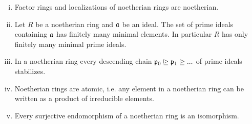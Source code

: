 	\begin{lemma}\vspace{-1.5em}
		\begin{enumerate}[(i)]
			\item{
				Factor rings and localizations of noetherian rings are noetherian.
			}
			\item{
				Let $R$ be a noetherian ring and $\mathfrak{a}$ be an ideal. The set of prime ideals containing $\mathfrak{a}$ has finitely many minimal elements. In particular $R$ has only finitely many minimal prime ideals.
			}
			\item{
				In a noetherian ring every descending chain $\mathfrak{p}_0 \trianglerighteq \mathfrak{p}_1 \trianglerighteq ...$ of prime ideals stabilizes.
			}
			\item{
				Noetherian rings are atomic, i.e. any element in a noetherian ring can be written as a product of irreducible elements.
			}
			\item{
				Every surjective endomorphism of a noetherian ring is an isomorphism.
			}
		\end{enumerate}
	\end{lemma}
